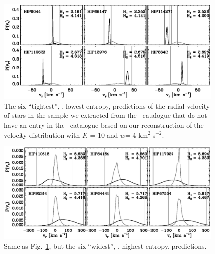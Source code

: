 \clearpage
\begin{figure}
\includegraphics[width=1.08\textwidth]{figs_veldist/info_hip_low.ps}
\caption[The six ``tightest'', \ie, lowest entropy, predictions of the radial velocity of stars in the sample we extracted from the \Hipparcos\ catalogue that do not have an entry in the \gcsabb\ catalogue based on our reconstruction of the velocity distribution]{The six ``tightest'', \ie, lowest entropy, predictions of the radial velocity of stars in the sample we extracted from the \Hipparcos\ catalogue that do not have an entry in the \gcsabb\ catalogue based on our reconstruction of the velocity distribution with $K$ = 10 and $w$= 4 km$^2$ s$^{-2}$.}%
\label{fig:info_hip_low}
\end{figure}

\clearpage
\begin{figure}
\includegraphics[width=1.08\textwidth]{figs_veldist/info_hip_high.ps}
\caption[Same as Fig.~\ref{fig:info_hip_low}, but the six ``widest'', \ie, highest entropy, predictions]{Same as Fig.~\ref{fig:info_hip_low}, but the six ``widest'', \ie, highest entropy, predictions.}%
\label{fig:info_hip_high}
\end{figure}


